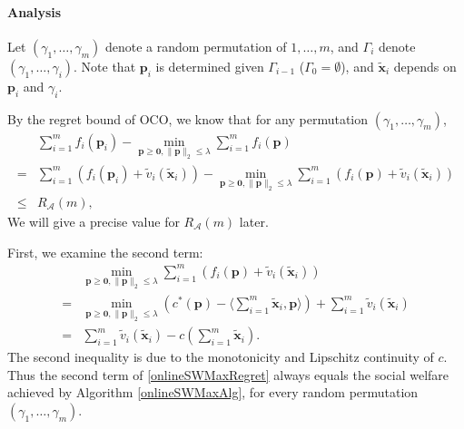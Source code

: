 \documentclass{article}
\begin{document}
\paragraph{Analysis}
Let $(\gamma_1,\ldots,\gamma_m)$ denote a random permutation of $1,\ldots,m$, and $\Gamma_i$ denote $(\gamma_1,\ldots,\gamma_i)$. Note that $\mathbf{p}_i$ is determined given $\Gamma_{i-1}$ ($\Gamma_0=\emptyset$), and $\tilde{\mathbf{x}}_i$ depends on $\mathbf{p}_i$ and $\gamma_i$.

By the regret bound of OCO, we know that for any permutation $(\gamma_1,\ldots,\gamma_m)$,
\begin{equation}\label{onlineSWMaxRegret}
    \begin{array}{rl}
         & \sum_{i=1}^{m}f_i(\mathbf{p}_i)-\min_{\mathbf{p}\ge \mathbf{0},\|\mathbf{p}\|_2\le\lambda}\sum_{i=1}^{m}f_i(\mathbf{p}) \\
        = & \sum_{i=1}^{m}(f_i(\mathbf{p}_i)+\tilde{v}_i(\tilde{\mathbf{x}}_i))-\min_{\mathbf{p}\ge \mathbf{0},\|\mathbf{p}\|_2\le\lambda}\sum_{i=1}^{m}(f_i(\mathbf{p})+\tilde{v}_i(\tilde{\mathbf{x}}_i)) \\
        \le & R_{\mathcal{A}}(m),
    \end{array}
\end{equation}
We will give a precise value for $R_{\mathcal{A}}(m)$ later.

First, we examine the second term:
\begin{equation}
    \begin{array}{rl}
         & \min_{\mathbf{p}\ge \mathbf{0},\|\mathbf{p}\|_2\le\lambda}\sum_{i=1}^{m}(f_i(\mathbf{p})+\tilde{v}_i(\tilde{\mathbf{x}}_i)) \\
        = & \min_{\mathbf{p}\ge \mathbf{0},\|\mathbf{p}\|_2\le\lambda}(c^*(\mathbf{p})-\langle \sum_{i=1}^{m}\tilde{\mathbf{x}}_i,\mathbf{p}\rangle)+\sum_{i=1}^{m}\tilde{v}_i(\tilde{\mathbf{x}}_i) \\
        = & \sum_{i=1}^{m}\tilde{v}_i(\tilde{\mathbf{x}}_i)-c(\sum_{i=1}^{m}\tilde{\mathbf{x}}_i).
    \end{array}
\end{equation}
The second inequality is due to the monotonicity and Lipschitz continuity of $c$. Thus the second term of \eqref{onlineSWMaxRegret} always equals the social welfare achieved by Algorithm \ref{onlineSWMaxAlg}, for every random permutation $(\gamma_1,\ldots,\gamma_m)$.
\end{document}

